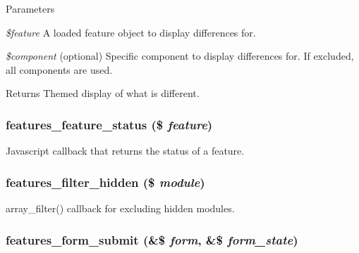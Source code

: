 \begin{DoxyParams}{Parameters}
\item[{\em \$feature}]A loaded feature object to display differences for. \item[{\em \$component}](optional) Specific component to display differences for. If excluded, all components are used.\end{DoxyParams}
\begin{DoxyReturn}{Returns}
Themed display of what is different. 
\end{DoxyReturn}
\hypertarget{features_8admin_8inc_a5a9ff088b5c6f067e95335ec71556680}{
\subsubsection[{features\_\-feature\_\-status}]{\setlength{\rightskip}{0pt plus 5cm}features\_\-feature\_\-status (\$ {\em feature})}}
\label{features_8admin_8inc_a5a9ff088b5c6f067e95335ec71556680}
Javascript callback that returns the status of a feature. \hypertarget{features_8admin_8inc_af7babbb51d0f379d5310298efa9ad49b}{
\subsubsection[{features\_\-filter\_\-hidden}]{\setlength{\rightskip}{0pt plus 5cm}features\_\-filter\_\-hidden (\$ {\em module})}}
\label{features_8admin_8inc_af7babbb51d0f379d5310298efa9ad49b}
array\_\-filter() callback for excluding hidden modules. \hypertarget{features_8admin_8inc_aca8adc8cb8a97cb12de36aed64449993}{
\subsubsection[{features\_\-form\_\-submit}]{\setlength{\rightskip}{0pt plus 5cm}features\_\-form\_\-submit (\&\$ {\em form}, \/  \&\$ {\em form\_\-state})}}
\label{features_8admin_8inc_aca8adc8cb8a97cb12de36aed64449993}
